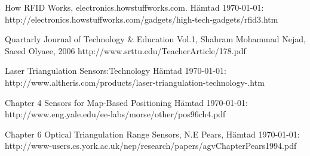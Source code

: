 \documentclass[a4paper,12pt,fleqn]{article}
\begin{document}
How RFID Works, electronics.howstuffworks.com. Hämtad \today:\newline
http://electronics.howstuffworks.com/gadgets/high-tech-gadgets/rfid3.htm

Quartarly Journal of Technology & Education Vol.1, 
Shahram Mohammad Nejad, Saeed Olyaee, 2006
http://www.srttu.edu/TeacherArticle/178.pdf

Laser Triangulation Sensors:Technology Hämtad \today:\newline
http://www.altheris.com/products/laser-triangulation-technology-.htm

Chapter 4 Sensors for Map-Based Positioning Hämtad \today:\newline
http://www.eng.yale.edu/ee-labs/morse/other/pos96ch4.pdf

Chapter 6 Optical Triangulation Range Sensors, N.E Pears, Hämtad \today:\newline 
http://www-users.cs.york.ac.uk/nep/research/papers/agvChapterPears1994.pdf
\end{document}
